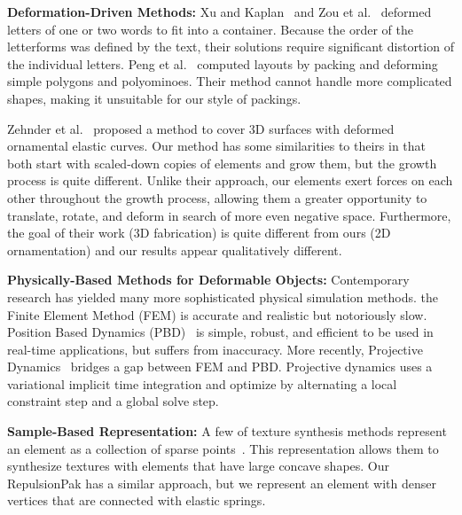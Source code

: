 \textbf{Deformation-Driven Methods:}
\newtext
{
Xu and Kaplan~\cite{Xu2007} and Zou et al.~\cite{Zou2016}
deformed letters of one or two words to fit into a container.
Because the order of the letterforms was defined by the text, their solutions
require significant distortion of the individual letters.
Peng et al.~\cite{Peng2014} computed layouts by packing and deforming
simple polygons and polyominoes. Their method cannot handle more
complicated shapes, making it unsuitable for our style of packings.
}

\newtext
{
Zehnder et al.~\cite{Zehnder2016} proposed a method to
cover 3D surfaces with deformed ornamental elastic curves.
Our method has some similarities to theirs in that both start with 
scaled-down copies of elements and grow them, but the growth process is quite different.  
Unlike their approach, our elements exert
forces on each other throughout the growth process, allowing them a greater
opportunity to translate, rotate, and deform in search of more even negative
space.  Furthermore, the goal of their work (3D fabrication) is quite 
different from ours (2D ornamentation) and our results appear qualitatively
different.
}






\newtext
{
\textbf{Physically-Based Methods for Deformable Objects:}
Contemporary research has yielded many more sophisticated physical simulation methods.
the Finite Element Method (FEM) is accurate and realistic but notoriously slow.
Position Based Dynamics (PBD)~\cite{Muller2007} is simple, robust, and efficient to be used in
real-time applications, but suffers from inaccuracy.
More recently, Projective Dynamics~\cite{Bouaziz2014} bridges a gap between FEM and PBD.
Projective dynamics uses a variational implicit time integration and optimize by
alternating a local constraint step and a global solve step.
}

\newtext
{
\textbf{Sample-Based Representation:}
A few of texture synthesis methods represent an element as a collection of sparse points~\cite{Ma2011, Ma2013, Hsu2020}.
This representation allows them to synthesize textures with elements
that have large concave shapes.
Our RepulsionPak has a similar approach, but we represent an element
with denser vertices that are connected with elastic springs.
}

